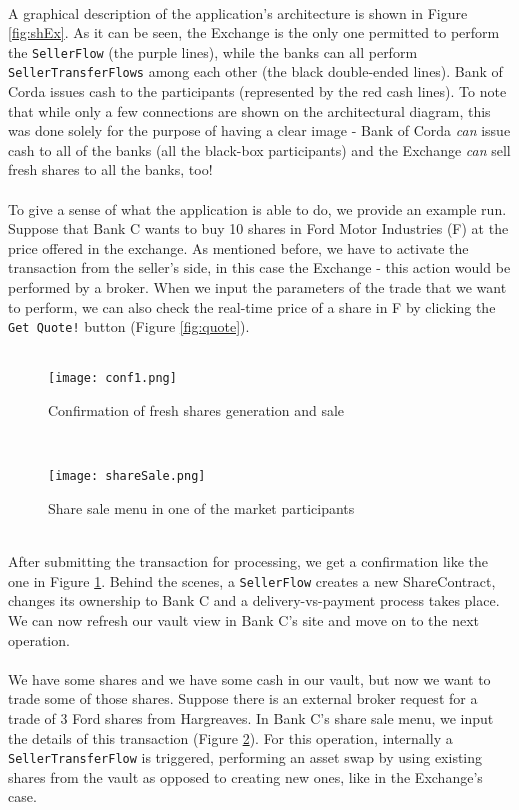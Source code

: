 \documentclass[12pt,twoside]{article}
\begin{document}
\\
A graphical description of the application's architecture is shown in Figure \ref{fig:shEx}. As it can be seen, the Exchange is the only one permitted to perform the \verb|SellerFlow| (the purple lines), while the banks can all perform \verb|SellerTransferFlows| among each other (the black double-ended lines). Bank of Corda issues cash to the participants (represented by the red cash lines). To note that while only a few connections are shown on the architectural diagram, this was done solely for the purpose of having a clear image - Bank of Corda \textit{can} issue cash to all of the banks (all the black-box participants) and the Exchange \textit{can} sell fresh shares to all the banks, too!
\\ \\
To give a sense of what the application is able to do, we provide an example run. Suppose that Bank C wants to buy 10 shares in Ford Motor Industries (F) at the price offered in the exchange. As mentioned before, we have to activate the transaction from the seller's side, in this case the Exchange - this action would be performed by a broker. When we input the parameters of the trade that we want to perform, we can also check the real-time price of a share in F by clicking the \verb|Get Quote!| button (Figure \ref{fig:quote}). \\ \\
\begin{figure}[!htb]
\centering
\texttt{[image: conf1.png]}
\caption{Confirmation of fresh shares generation and sale}
\centering
\label{fig:conf1}
\end{figure}
\\
\begin{figure}[!htb]
\centering
\texttt{[image: shareSale.png]}
\caption{Share sale menu in one of the market participants}
\centering
\label{fig:shareSale}
\end{figure}
\\
After submitting the transaction for processing, we get a confirmation like the one in Figure \ref{fig:conf1}. Behind the scenes, a \verb|SellerFlow| creates a new ShareContract, changes its ownership to Bank C and a delivery-vs-payment process takes place. We can now refresh our vault view in Bank C's site and move on to the next operation.
\\ \\
We have some shares and we have some cash in our vault, but now we want to trade some of those shares. Suppose there is an external broker request for a trade of 3 Ford shares from Hargreaves. In Bank C's share sale menu, we input the details of this transaction (Figure \ref{fig:shareSale}). For this operation, internally a \verb|SellerTransferFlow| is triggered, performing an asset swap by using existing shares from the vault as opposed to creating new ones, like in the Exchange's case.
\end{document}
